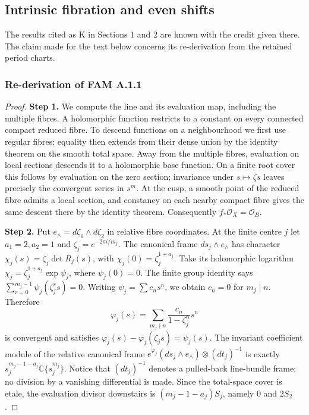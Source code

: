 \documentclass[11pt,a4paper]{article}
\theoremstyle{plain}
\theoremstyle{definition}
\begin{document}
\subsection{Intrinsic fibration and even shifts}\label{app:known-periods}
The results cited as K in Sections 1 and 2 are known with the credit given there. The claim made for the text below concerns its re-derivation from the retained period charts.
\subsubsection{Re-derivation of FAM A.1.1}
\begin{proof}
\par\smallskip\noindent\textbf{Step 1.} We compute the line and its evaluation map, including the multiple fibres. A holomorphic function restricts to a constant on every connected compact reduced fibre. To descend functions on a neighbourhood we first use regular fibres; equality then extends from their dense union by the identity theorem on the smooth total space. Away from the multiple fibres, evaluation on local sections descends it to a holomorphic base function. On a finite root cover this follows by evaluation on the zero section; invariance under $s\mapsto\zeta s$ leaves precisely the convergent series in $s^m$. At the cusp, a smooth point of the reduced fibre admits a local section, and constancy on each nearby compact fibre gives the same descent there by the identity theorem. Consequently $f_*\mathcal O_X=\mathcal O_B$.

\par\smallskip\noindent\textbf{Step 2.} Put $e_\wedge=d\zeta_1\wedge d\zeta_2$ in relative fibre coordinates. At the finite centre $j$ let $a_1=2,a_2=1$ and $\zeta_j=e^{-2\pi i/m_j}$. The canonical frame $ds_j\wedge e_\wedge$ has character $\chi_j(s)=\zeta_j\det R_j(s)$, with $\chi_j(0)=\zeta_j^{1+a_j}$. Take its holomorphic logarithm $\chi_j=\zeta_j^{1+a_j}\exp\psi_j$, where $\psi_j(0)=0$. The finite group identity says $\sum_{r=0}^{m_j-1}\psi_j(\zeta_j^r s)=0$. Writing $\psi_j=\sum c_ns^n$, we obtain $c_n=0$ for $m_j\mid n$. Therefore
\[
 \varphi_j(s)=\sum_{m_j\nmid n}\frac{c_n}{1-\zeta_j^n}s^n
\]
is convergent and satisfies $\varphi_j(s)-\varphi_j(\zeta_js)=\psi_j(s)$. The invariant coefficient module of the relative canonical frame
$e^{\varphi_j}(ds_j\wedge e_\wedge)\otimes(dt_j)^{-1}$ is exactly
$s_j^{m_j-1-a_j}\mathbb C\{s_j^{m_j}\}$. Notice that $(dt_j)^{-1}$ denotes a pulled-back line-bundle frame; no division by a vanishing differential is made. Since the total-space cover is etale, the evaluation divisor downstairs is $(m_j-1-a_j)S_j$, namely $0$ and $2S_2$.


\end{proof}
\end{document}
